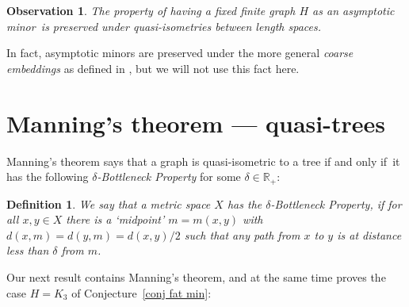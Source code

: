 \documentclass[a4paper]{article}
\newcommand{\comment}[1]{}
\newcommand{\defi}[1]{{\color{darkgray}\emph{#1}}}
\newtheorem{lemma}[proposition]{Lemma}
\newtheorem{observation}[proposition]{Observation}
\newcommand{\R}{\ensuremath{\mathbb R}}
\newcommand{\Cnr}[1]{Con\-jecture~\ref{#1}}
\renewcommand{\iff}{if and only if}
\newcommand{\fe}{for every}
\newcommand{\st}{such that}
\newcommand{\asmi}{asymptotic minor}
\newtheorem{remark}{Remark}
\newtheorem{Def}{Definition}
\begin{document}
\begin{observation} \label{invariance}
The property of having a fixed finite graph $H$ as an \asmi\ is preserved under quasi-isometries between length spaces.
\end{observation}

In fact, \asmi s are preserved under the more general \defi{coarse embeddings} as defined in \cite{GroAsyInv,Ostrovskii}, but we will not use this fact here.

\comment{
\section{A Coarse Ramsey Theorem}

\begin{lemma} \label{ramsey}
(Coarse Ramsey Theorem)  Let $(X,d)$ be a metric space, and $U\subset X$ infinite. Then \fe\ $R\in \R_+$, there is either\\
A) an infinite $U'\subset U$ \st\ $d(u,v)>R$ \fe\ $u,v\in U'$, or \\
B) a ball of radius $R$ in $X$ containing all but finitely many elements of $U$.
\end{lemma}
\begin{proof}
If B) fails, then we can construct $U'$ greedily, by picking points $v_i$ of $U$ one by one, and removing the balls $B_{v_i}(R)$ from $U$.
\end{proof}
 
\begin{remark}

\end{remark}
}


\section{Manning's theorem --- quasi-trees} \label{quasitree}

Manning's theorem  \cite{Manning} says that a graph is quasi-isometric to a tree \iff\ it has the following \defi{$\delta$-\defi{Bottleneck Property}} for some $\delta\in \R_+$:

\begin{Def}
We say that a metric space $X$ has the $\delta$-\defi{Bottleneck Property},  if for all $x, y \in X$  there is a `midpoint' $m = m(x,y)$ with $d(x,m) = d(y,m) = d(x,y)/2$ such that any path from $x$ to $y$ is at distance less than $\delta$ from $m$.
\end{Def}

Our next result contains Manning's theorem, and at the same time proves the case $H=K_3$ of \Cnr{conj fat min}:
\end{document}
